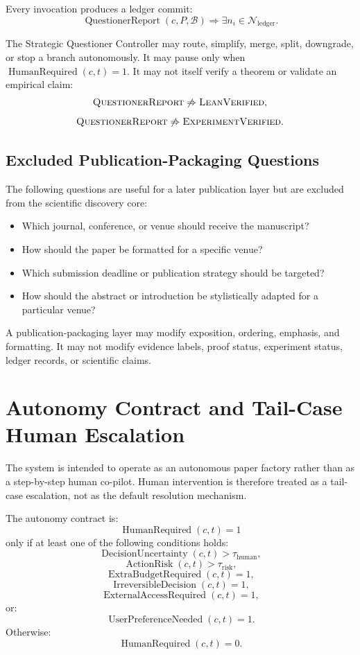 \documentclass[11pt]{article}
\begin{document}
Every invocation produces a ledger commit:
$$
\operatorname{QuestionerReport}(c,P,\mathcal{B})\Rightarrow \exists n_i\in\mathcal{N}_{\mathrm{ledger}}.
$$

The Strategic Questioner Controller may route, simplify, merge, split, downgrade, or stop a branch autonomously. It may pause only when $\operatorname{HumanRequired}(c,t)=1$. It may not itself verify a theorem or validate an empirical claim:
$$
\textsc{QuestionerReport}\not\Rightarrow\textsc{LeanVerified},
$$
$$
\textsc{QuestionerReport}\not\Rightarrow\textsc{ExperimentVerified}.
$$

\subsection{Excluded Publication-Packaging Questions}

The following questions are useful for a later publication layer but are excluded from the scientific discovery core:
\begin{itemize}[leftmargin=*]
    \item Which journal, conference, or venue should receive the manuscript?
    \item How should the paper be formatted for a specific venue?
    \item Which submission deadline or publication strategy should be targeted?
    \item How should the abstract or introduction be stylistically adapted for a particular venue?
\end{itemize}

A publication-packaging layer may modify exposition, ordering, emphasis, and formatting. It may not modify evidence labels, proof status, experiment status, ledger records, or scientific claims.


\section{Autonomy Contract and Tail-Case Human Escalation}

The system is intended to operate as an autonomous paper factory rather than as a step-by-step human co-pilot. Human intervention is therefore treated as a tail-case escalation, not as the default resolution mechanism.

The autonomy contract is:
$$
\operatorname{HumanRequired}(c,t)=1
$$
only if at least one of the following conditions holds:
$$
\operatorname{DecisionUncertainty}(c,t)>\tau_{\text{human}},
$$
$$
\operatorname{ActionRisk}(c,t)>\tau_{\text{risk}},
$$
$$
\operatorname{ExtraBudgetRequired}(c,t)=1,
$$
$$
\operatorname{IrreversibleDecision}(c,t)=1,
$$
$$
\operatorname{ExternalAccessRequired}(c,t)=1,
$$
or:
$$
\operatorname{UserPreferenceNeeded}(c,t)=1.
$$
Otherwise:
$$
\operatorname{HumanRequired}(c,t)=0.
$$
\end{document}
